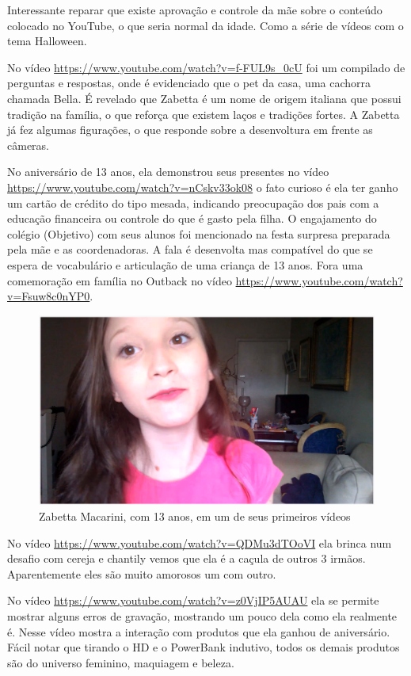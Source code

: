 Interessante reparar que existe aprovação e controle da mãe sobre o conteúdo colocado no YouTube, o que seria normal da idade. Como a série de vídeos com o tema Halloween.

No vídeo \url{https://www.youtube.com/watch?v=f-FUL9s_0cU} foi um compilado de perguntas e respostas, onde é evidenciado que o pet da casa, uma cachorra chamada Bella. É revelado que Zabetta é um nome de origem italiana que possui tradição na família, o que reforça que existem laços e tradições fortes. A Zabetta já fez algumas figurações, o que responde sobre a desenvoltura em frente as câmeras.

No aniversário de 13 anos, ela demonstrou seus presentes no vídeo \url{https://www.youtube.com/watch?v=nCskv33ok08} o fato curioso é ela ter ganho um cartão de crédito do tipo mesada, indicando preocupação dos pais com a educação financeira ou controle do que é gasto pela filha. O engajamento do colégio (Objetivo) com seus alunos foi mencionado na festa surpresa preparada pela mãe e as coordenadoras. A fala é desenvolta mas compatível do que se espera de vocabulário e articulação de uma criança de 13 anos. Fora uma comemoração em família no Outback no vídeo \url{https://www.youtube.com/watch?v=Fsuw8c0nYP0}.

\begin{figure}
    \centering
    \includegraphics[width=0.7\linewidth]{fig/Zabetta-13-anos}
    \caption{Zabetta Macarini, com 13 anos, em um de seus primeiros vídeos}
    \label{fig:zabetta-13-anos}
\end{figure}


No vídeo \url{https://www.youtube.com/watch?v=QDMu3dTOoVI} ela brinca num desafio com cereja e chantily vemos que ela é a caçula de outros 3 irmãos. Aparentemente eles são muito amorosos um com outro.

No vídeo \url{https://www.youtube.com/watch?v=z0VjIP5AUAU} ela se permite mostrar alguns erros de gravação, mostrando um pouco dela como ela realmente é. Nesse vídeo mostra a interação com produtos que ela ganhou de aniversário. Fácil notar que tirando o HD e o PowerBank indutivo, todos os demais produtos são do universo feminino, maquiagem e beleza.



